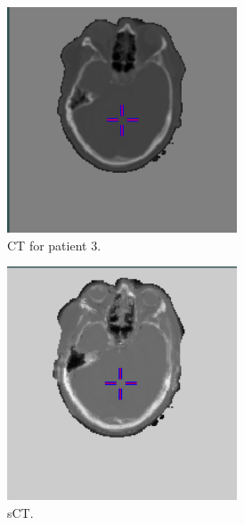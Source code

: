 \begin{figure}[H]
\begin{subfigure}[b]{0.3\textwidth}
        \includegraphics[width=0.75\textwidth]{colager/loocv_ct/loocv_010850_ct.png}
        \caption{CT for patient 3.}
        \label{col:loocv_ct_pat3_ct}
    \end{subfigure}\hfill
    \begin{subfigure}[b]{0.3\textwidth}
        \centering
        \includegraphics[width=0.75\textwidth]{colager/loocv_ct/loocv_010850_sct.png}
        \caption{sCT.}
        \label{col:loocv_ct_pat3_sct}
    \end{subfigure}\hfill
    \begin{subfigure}[b]{0.3\textwidth}
        \centering

\end{subfigure}
\end{figure}
